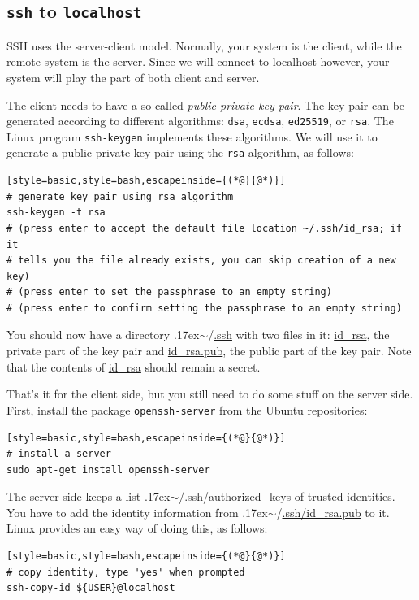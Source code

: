 \documentclass[12pt, a4paper, twoside, openany, titlepage]{book}
\newcommand{\mytilde}{\raise.17ex\hbox{$\scriptstyle\sim$}}
\begin{document}
\subsection{\texttt{ssh} to \texttt{localhost}}

SSH uses the server-client model. Normally, your system is the client, while the remote system is the server. Since we will connect to \url{localhost} however, your system will play the part of both client and server.

The client needs to have a so-called \textit{public-private key pair}. The key pair can be generated according to different algorithms:
\texttt{dsa},
\texttt{ecdsa},
\texttt{ed25519}, or
\texttt{rsa}.
The Linux program \texttt{ssh-keygen} implements these algorithms. We will use it to generate a public-private key pair using the \texttt{rsa} algorithm, as follows:

\begin{lstlisting}[style=basic,style=bash,escapeinside={(*@}{@*)}]
# generate key pair using rsa algorithm
ssh-keygen -t rsa
# (press enter to accept the default file location ~/.ssh/id_rsa; if it
# tells you the file already exists, you can skip creation of a new key)
# (press enter to set the passphrase to an empty string)
# (press enter to confirm setting the passphrase to an empty string)
\end{lstlisting}

You should now have a directory \mytilde/\url{.ssh} with two files in it: \url{id_rsa},  the private part of the key pair and \url{id_rsa.pub}, the public part of the key pair. Note that the contents of \url{id_rsa} should remain a secret.

That's it for the client side, but you still need to do some stuff on the server side. First, install the package \texttt{openssh-server} from the Ubuntu repositories:
\begin{lstlisting}[style=basic,style=bash,escapeinside={(*@}{@*)}]
# install a server
sudo apt-get install openssh-server
\end{lstlisting} %

The server side keeps a list \mytilde/\url{.ssh/authorized_keys} of trusted identities. You have to add the identity information from \mytilde/\url{.ssh/id_rsa.pub} to it. Linux provides an easy way of doing this, as follows:
\begin{lstlisting}[style=basic,style=bash,escapeinside={(*@}{@*)}]
# copy identity, type 'yes' when prompted
ssh-copy-id ${USER}@localhost
\end{lstlisting} %
\end{document}

